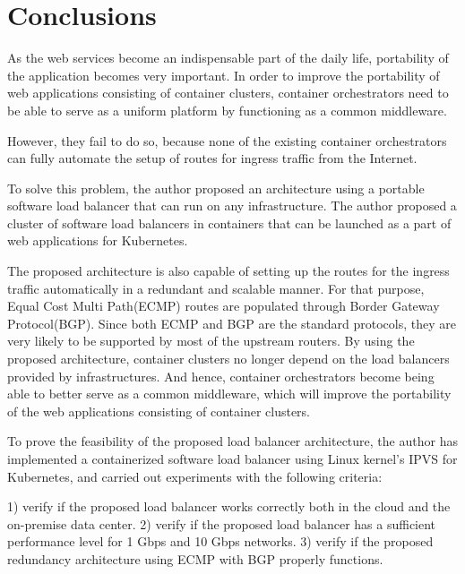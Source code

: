 \section{Conclusions}\label{Conclusions}

As the web services become an indispensable part of the daily life, portability of the application becomes very important.
%
In order to improve the portability of web applications consisting of container clusters, container orchestrators need to be able to serve as a uniform platform by functioning as a common middleware.

However, they fail to do so, because none of the existing container orchestrators can fully automate the setup of routes for ingress traffic from the Internet.



To solve this problem, the author proposed an architecture using a portable software load balancer that can run on any infrastructure.
The author proposed a cluster of software load balancers in containers that can be launched as a part of web applications for Kubernetes.

%
The proposed architecture is also capable of setting up the routes for the ingress traffic automatically in a redundant and scalable manner.
  For that purpose, Equal Cost Multi Path(ECMP) routes are populated through Border Gateway Protocol(BGP).
  Since both ECMP and BGP are the standard protocols, they are very likely to be supported by most of the upstream routers.
  By using the proposed architecture, container clusters no longer depend on the load balancers provided by infrastructures.
  And hence, container orchestrators become being able to better serve as a common middleware, which will improve the portability of the web applications consisting of container clusters.




To prove the feasibility of the proposed load balancer architecture, the author has implemented a containerized software load balancer using Linux kernel's IPVS for Kubernetes, and carried out experiments with the following criteria:

  1) verify if the proposed load balancer works correctly both in the cloud and the on-premise data center.
  2) verify if the proposed load balancer has a sufficient performance level for 1 Gbps and 10 Gbps networks.
  3) verify if the proposed redundancy architecture using ECMP with BGP properly functions.



